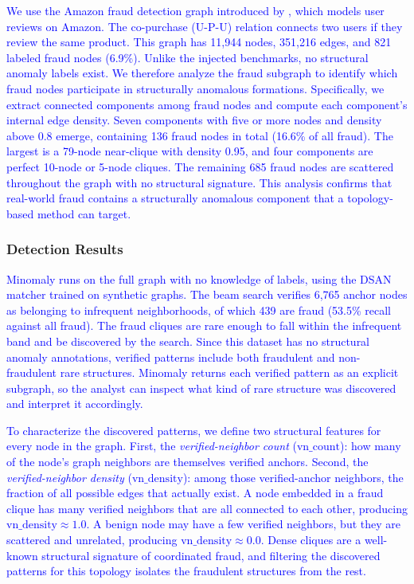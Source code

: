 \documentclass[preprint,12pt]{elsarticle}
\newcommand{\new}[1]{\textcolor{blue}{#1}}
\theoremstyle{plain}
\theoremstyle{definition}
\theoremstyle{remark}
\begin{document}
\new{We use the Amazon fraud detection graph introduced by \cite{dou2020enhancing}, which models user reviews on Amazon. The co-purchase (U-P-U) relation connects two users if they review the same product. This graph has 11{,}944 nodes, 351{,}216 edges, and 821 labeled fraud nodes (6.9\%). Unlike the injected benchmarks, no structural anomaly labels exist. We therefore analyze the fraud subgraph to identify which fraud nodes participate in structurally anomalous formations. Specifically, we extract connected components among fraud nodes and compute each component's internal edge density. Seven components with five or more nodes and density above 0.8 emerge, containing 136 fraud nodes in total (16.6\% of all fraud). The largest is a 79-node near-clique with density 0.95, and four components are perfect 10-node or 5-node cliques. The remaining 685 fraud nodes are scattered throughout the graph with no structural signature. This analysis confirms that real-world fraud contains a structurally anomalous component that a topology-based method can target.}

\subsubsection{Detection Results}

\new{Minomaly runs on the full graph with no knowledge of labels, using the DSAN matcher trained on synthetic graphs. The beam search verifies 6{,}765 anchor nodes as belonging to infrequent neighborhoods, of which 439 are fraud (53.5\% recall against all fraud). The fraud cliques are rare enough to fall within the infrequent band and be discovered by the search. Since this dataset has no structural anomaly annotations, verified patterns include both fraudulent and non-fraudulent rare structures. Minomaly returns each verified pattern as an explicit subgraph, so the analyst can inspect what kind of rare structure was discovered and interpret it accordingly.}

\new{To characterize the discovered patterns, we define two structural features for every node in the graph. First, the \emph{verified-neighbor count} ($\mathrm{vn\_count}$): how many of the node's graph neighbors are themselves verified anchors. Second, the \emph{verified-neighbor density} ($\mathrm{vn\_density}$): among those verified-anchor neighbors, the fraction of all possible edges that actually exist. A node embedded in a fraud clique has many verified neighbors that are all connected to each other, producing $\mathrm{vn\_density} \approx 1.0$. A benign node may have a few verified neighbors, but they are scattered and unrelated, producing $\mathrm{vn\_density} \approx 0.0$. Dense cliques are a well-known structural signature of coordinated fraud, and filtering the discovered patterns for this topology isolates the fraudulent structures from the rest.}
\end{document}
